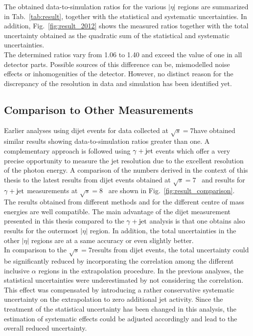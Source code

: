 The obtained data-to-simulation ratios for the various $|\eta|$ regions are summarized in Tab.~\ref{tab:result}, together with the statistical and systematic uncertainties. In addition, Fig.~\ref{fig:result_2012} shows the measured ratios together with the total uncertainty obtained as the quadratic sum of the statistical and systematic uncertainties. 
\\
The determined ratios vary from 1.06 to 1.40 and exceed the value of one in all detector parts. Possible sources of this difference can be, \eg mismodelled noise effects or inhomogenities of the detector. However, no distinct reason for the discrepancy of the resolution in data and simulation has been identified yet. 

 
\subsection{Comparison to Other Measurements}
\label{subsec:jer_results_comparison}
Earlier analyses using dijet events for data collected at $\sqrt{s}=7$\tev have obtained similar results showing data-to-simulation ratios greater than one. A complementary approach is followed using $\gamma +\rm{jet}$ events which offer a very precise opportunity to measure the jet resolution due to the excellent resolution of the photon energy. A comparison of the numbers derived in the context of this thesis to the latest results from dijet events obtained at $\sqrt{s}=7$\tev~\cite{thesis:Schroeder} and results for $\gamma +\rm{jet}$ measurements at $\sqrt{s}=8$\tev~\cite{CMS-AN-2013-179} are shown in Fig.~\ref{fig:result_comparison}.
\\
The results obtained from different methods and for the different centre of mass energies are well compatible. The main advantage of the dijet measurement presented in this thesis compared to the $\gamma +\rm{jet}$ analysis is that one obtains also results for the outermost $|\eta|$ region. In addition, the total uncertainties in the other $|\eta|$ regions are at a same accuracy or even slightly better. 
\\
In comparison to the $\sqrt{s}=7$\tev results from dijet events, the total uncertainty could be significantly reduced by incorporating the correlation among the different inclusive $\alpha$ regions in the extrapolation procedure. In the previous analyses, the statistical uncertainties were underestimated by not considering the correlation. This effect was compensated by introducing a rather conservative systematic uncertainty on the extrapolation to zero additional jet activity. Since the treatment of the statistical uncertainty has been changed in this analysis, the estimation of systematic effects could be adjusted accordingly and lead to the overall reduced uncertainty.
